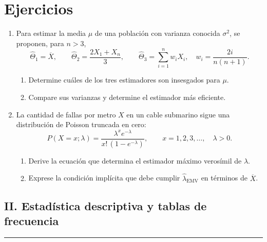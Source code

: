 \documentclass[letterpaper,12pt]{article}
\newenvironment{ejercicios}{%
    \section*{Ejercicios}
}{}
\begin{document}
\begin{ejercicios}
\begin{enumerate}[leftmargin=*,itemsep=0.9em]
    \item Para estimar la media $\mu$ de una población con varianza conocida $\sigma^2$, se proponen, para $n>3$,
    \[
        \widehat\Theta_1=\overline X, \qquad
        \widehat\Theta_2=\frac{2X_1+X_n}{3}, \qquad
        \widehat\Theta_3=\sum_{i=1}^{n}w_iX_i,
        \quad w_i=\frac{2i}{n(n+1)}.
    \]
    \begin{enumerate}[label=\alph*)]
        \item Determine cuáles de los tres estimadores son insesgados para $\mu$.
        \item Compare sus varianzas y determine el estimador más eficiente.
    \end{enumerate}

    \item La cantidad de fallas por metro $X$ en un cable submarino sigue una distribución de Poisson truncada en cero:
    \[
        P(X=x;\lambda)=\frac{\lambda^xe^{-\lambda}}{x!\,(1-e^{-\lambda})},
        \qquad x=1,2,3,\dots,\quad \lambda>0.
    \]
    \begin{enumerate}[label=\alph*)]
        \item Derive la ecuación que determina el estimador máximo verosímil de $\lambda$.
        \item Exprese la condición implícita que debe cumplir $\widehat\lambda_{\mathrm{EMV}}$ en términos de $\overline X$.
    \end{enumerate}

\end{enumerate}

\subsection*{II. Estadística descriptiva y tablas de frecuencia}
\hrule
\vspace{0.4cm}

\begin{enumerate}[resume,leftmargin=*,itemsep=0.9em]


\end{enumerate}
\end{ejercicios}
\end{document}
